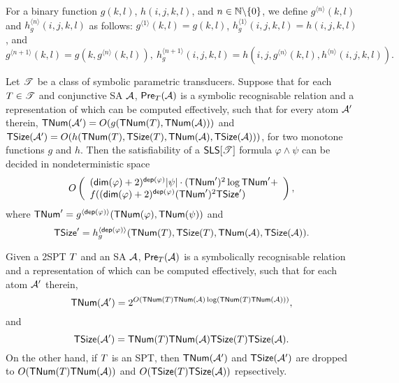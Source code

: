 For a binary function $g(k, l)$, $h(i, j, k, l)$, and $n \in \mathbb{N} \backslash \{0\}$, we define $g^{\langle n \rangle}(k, l)$ and $h^{\langle n \rangle}_g(i, j, k, l)$ as follows: $g^{\langle 1 \rangle}( k, l) = g(k, l)$, $h^{\langle 1 \rangle}_g(i, j, k, l) = h(i, j, k, l)$, and 
$$g^{\langle n+1 \rangle}( k, l) = g(k, g^{\langle n \rangle}( k, l)), \ h^{\langle n+1 \rangle}_g (i, j, k, l) = h(i, j, g^{\langle n \rangle}(k, l), h^{\langle n \rangle}(i, j, k, l)).$$
\begin{theorem}\label{thm-generic-dec-symbolic}
Let $\mathscr{T}$ be a class of symbolic parametric transducers. Suppose that %
for each $T \in \mathscr{T}$ and conjunctive SA $\mathcal{A}$, $\textsf{Pre}_{T}(\mathcal{A})$ is a symbolic recognisable relation and a representation of which can be computed effectively, 
such that for every atom $\mathcal{A}'$ therein, 
$\mathsf{TNum}(\mathcal{A}') = O(g(\mathsf{TNum}(T),  \mathsf{TNum}(\mathcal{A})))$ and 
$\mathsf{TSize}(\mathcal{A}') = O(h(\mathsf{TNum}(T), \mathsf{TSize}(T), \mathsf{TNum}(\mathcal{A}), \mathsf{TSize}(\mathcal{A})))$, for two monotone functions $g$ and $h$.
Then the satisfiability of a $\textsf{SLS}[\mathscr{T}]$ formula $\varphi \wedge \psi$ can be decided in nondeterministic space
$$
O\left(
\begin{array}{l}
(\mathsf{dim}(\varphi)+2)^{\mathsf{dep}(\varphi)}|\psi| \cdot (\mathsf{TNum}')^2 \log \mathsf{TNum}' + \\
f((\mathsf{dim}(\varphi)+2)^{\mathsf{dep}(\varphi)} (\mathsf{TNum}')^2 \mathsf{TSize}')  
\end{array}
\right),
$$ 
where $\mathsf{TNum}' = g^{\langle \mathsf{dep}(\varphi) \rangle}(\mathsf{TNum}(\varphi), \mathsf{TNum}(\psi))$ and 
$$\mathsf{TSize}' = h^{\langle \mathsf{dep}(\varphi) \rangle}_g(\mathsf{TNum}(T), \mathsf{TSize}(T), \mathsf{TNum}(\mathcal{A}), \mathsf{TSize}(\mathcal{A})).$$
\end{theorem}


\begin{lemma}\label{lem-spt}
Given a 2SPT $T$ and an SA $\mathcal{A}$, $\textsf{Pre}_{T}(\mathcal{A})$ is a symbolically recognisable relation and a representation of which can be computed effectively, such that for each atom $\mathcal{A}'$ therein, 
$$\mathsf{TNum}(\mathcal{A}') = 2^{O(\mathsf{TNum}(T)\mathsf{TNum}(\mathcal{A}) \log (\mathsf{TNum}(T)\mathsf{TNum}(\mathcal{A})))},$$ 
and 
$$\mathsf{TSize}(\mathcal{A}') = \mathsf{TNum}(T) \mathsf{TNum}(\mathcal{A})\mathsf{TSize}(T) \mathsf{TSize}(\mathcal{A}).$$
On the other hand, if $T$ is an SPT, then $\mathsf{TNum}(\mathcal{A}')$ and $\mathsf{TSize}(\mathcal{A}')$ are dropped to $O(\mathsf{TNum}(T)\mathsf{TNum}(\mathcal{A}))$ and $O(\mathsf{TSize}(T) \mathsf{TSize}(\mathcal{A}))$ repsectively.
\end{lemma}

